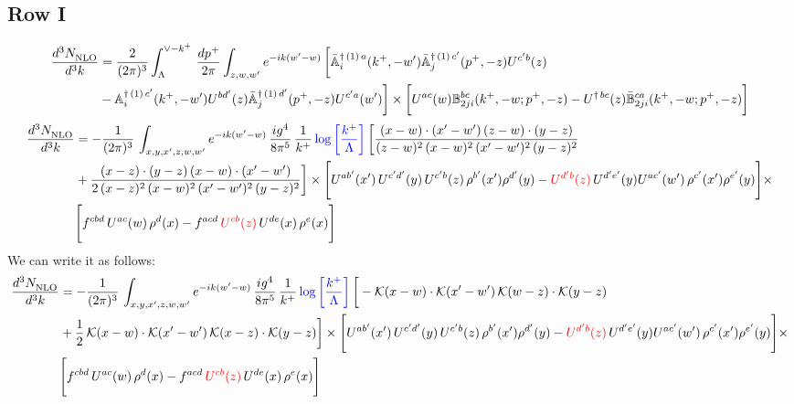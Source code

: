 \documentclass[9pt]{article}
\def\mf#1{\mathbb{#1}}
\newcommand{\chg}[1]{{\color{red}#1}}
\numberwithin{equation}{section}
\begin{document}
\subsection{Row I}
\begin{align}
 \frac{d^{3}N_{\rm NLO}^{\rm}}{d^{3}k}  & =    \frac{2}{(2\pi)^{3}} \int_{\Lambda}^{\vee - k^{+}}\, \frac{dp^{+}}{2\pi}\int_{z,w,w^{\prime}} e^{-ik(w^{\prime}-w)}\, 
        \bigg[\Bar{\mf{A}}^{\dagger\, (1)\, a}_{i}(k^{+},-w^{\prime})\Bar{\mf{A}}^{\dagger\, (1)\, c^{\prime}}_{j}(p^{+},-z)U^{c^{\prime}b}(z)\notag \\ & -\mf{A}^{\dagger\, (1)\, c^{\prime}}_{i}(k^{+},- w^{\prime})U^{bd^{\prime}}(z)\Bar{\mf{A}}^{\dagger\, (1)\, d^{\prime}}_{j}(p^{+},-z)U^{c^{\prime}a}(w^{\prime})  \bigg]\times \bigg[U^{ac}(w) \mf{B}^{bc}_{2ji}(k^{+},-w;p^{+},-z) -U^{\dagger\, bc}(z)\Bar{\mf{B}}^{ca}_{2ji}(k^{+},-w; p^{+},-z)\bigg] \nonumber
\end{align}
\begin{align}
    \frac{d^{3}N_{\rm NLO}^{\rm}}{d^{3}k}  & = -\frac{1}{(2\pi)^{3}}\, \int_{x,y,x',z,w,w^{\prime}} e^{-ik(w^{\prime}-w)}\,\frac{ig^{4}}{8\pi^{5}}\,\frac{1}{k^{+}}\,{\color{blue}\log{\left[\frac{k^{+}}{\Lambda}\right]}}\,\bigg[\frac{(x-w)\cdot (x'-w')\,(z-w)\cdot (y-z)}{(z-w)^{2}\,(x-w)^{2}\,(x'-w')^{2}\,(y-z)^{2}}\notag \\ & +\frac{(x-z)\cdot (y-z)\,(x-w)\cdot (x'-w')}{2\,(x-z)^{2}\, (x-w)^{2}\,(x'-w')^{2}\,(y-z)^{2}}\bigg]\times  \Bigg[U^{ab'}(x')\,U^{c'd'}(y)\,U^{c'b}(z)\,\rho^{b'}(x')\rho^{d'}(y)-\chg{U^{d'b}(z)}\,U^{d'e'}(y)U^{ac'}(w')\,\rho^{c'}(x')\rho^{e'}(y)\Bigg]\times\notag \\ & \Bigg[f^{cbd}\,U^{ac}(w)\,\rho^{d}(x)-f^{acd}\, \chg{U^{cb}(z)}\,U^{de}(x)\,\rho^{e}(x)\Bigg] 
\end{align}
We can write it as follows: 
\begin{align}
    \frac{d^{3}N_{\rm NLO}^{\rm}}{d^{3}k}  & = -\frac{1}{(2\pi)^{3}}\, \int_{x,y,x',z,w,w^{\prime}} e^{-ik(w^{\prime}-w)}\,\frac{ig^{4}}{8\pi^{5}}\,\frac{1}{k^{+}}\,{\color{blue}\log{\left[\frac{k^{+}}{\Lambda}\right]}}\,\bigg[-\mathcal{K}(x-w)\cdot \mathcal{K}(x'-w')\, \mathcal{K}(w-z)\cdot \mathcal{K}(y-z)\notag \\ & +\frac{1}{2}\,\mathcal{K}(x-w)\cdot \mathcal{K}(x'-w')\, \mathcal{K}(x-z)\cdot \mathcal{K}(y-z)\bigg]\times  \Bigg[U^{ab'}(x')\,U^{c'd'}(y)\,U^{c'b}(z)\,\rho^{b'}(x')\rho^{d'}(y)-\chg{U^{d'b}(z)}\,U^{d'e'}(y)U^{ac'}(w')\,\rho^{c'}(x')\rho^{e'}(y)\Bigg]\times\notag \\ & \Bigg[f^{cbd}\,U^{ac}(w)\,\rho^{d}(x)-f^{acd}\, \chg{U^{cb}(z)}\,U^{de}(x)\,\rho^{e}(x)\Bigg] 
\end{align}
\end{document}
